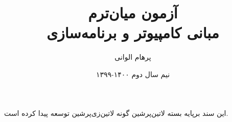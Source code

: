 \documentclass[]{article}
\title{آزمون میان‌ترم\\مبانی کامپیوتر و برنامه‌سازی}
\author{پرهام الوانی}
\date{نیم سال دوم ۱۴۰۰-۱۳۹۹}
\begin{document}
    \maketitle

    
    \vspace*{\fill}
    \begin{center}
این سند برپایه بسته ‌لاتین{‌پرشین} گونه ‌لاتین{‌زی‌پرشین} توسعه پیدا کرده است.
    \end{center}
\end{document}
